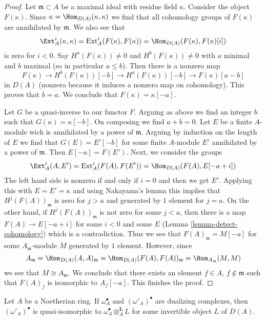 \begin{proof}
Let $\mathfrak m \subset A$ be a maximal ideal with residue field $\kappa$.
Consider the object $F(\kappa)$. Since
$\kappa = \Hom_{D(A)}(\kappa, \kappa)$ we find that all
cohomology groups of $F(\kappa)$ are annihilated by $\mathfrak m$.
We also see that
$$
\Ext^i_A(\kappa, \kappa) = \text{Ext}^i_A(F(\kappa), F(\kappa))
= \Hom_{D(A)}(F(\kappa), F(\kappa)[i])
$$
is zero for $i < 0$. Say $H^a(F(\kappa)) \not = 0$ and
$H^b(F(\kappa)) \not = 0$ with $a$ minimal and $b$ maximal
(so in particular $a \leq b$). Then there is a nonzero map
$$
F(\kappa) \to H^b(F(\kappa))[-b] \to H^a(F(\kappa))[-b]
\to F(\kappa)[a - b]
$$
in $D(A)$ (nonzero because it induces a nonzero map on cohomology).
This proves that $b = a$. We conclude that $F(\kappa) = \kappa[-a]$.

\medskip\noindent
Let $G$ be a quasi-inverse to our functor $F$. Arguing as above
we find an integer $b$ such that $G(\kappa) = \kappa[-b]$.
On composing we find $a + b = 0$. Let $E$ be a finite $A$-module
wich is annihilated by a power of $\mathfrak m$. Arguing by
induction on the length of $E$ we find that $G(E) = E'[-b]$
for some finite $A$-module $E'$ annihilated by a power of
$\mathfrak m$. Then $E[-a] = F(E')$.
Next, we consider the groups
$$
\Ext^i_A(A, E') = \text{Ext}^i_A(F(A), F(E')) =
\Hom_{D(A)}(F(A), E[-a + i])
$$
The left hand side is nonzero if and only if $i = 0$ and then
we get $E'$. Applying this with $E = E' = \kappa$ and using Nakayama's
lemma this implies that $H^j(F(A))_\mathfrak m$ is zero for $j > a$ and
generated by $1$ element for $j = a$. On the other hand, if
$H^j(F(A))_\mathfrak m$ is not zero for some $j < a$, then
there is a map $F(A) \to E[-a + i]$ for some $i < 0$ and some
$E$ (Lemma \ref{lemma-detect-cohomology}) which is a contradiction.
Thus we see that $F(A)_\mathfrak m = M[-a]$
for some $A_\mathfrak m$-module $M$ generated by $1$ element.
However, since
$$
A_\mathfrak m = \Hom_{D(A)}(A, A)_\mathfrak m =
\Hom_{D(A)}(F(A), F(A))_\mathfrak m = \Hom_{A_\mathfrak m}(M, M)
$$
we see that $M \cong A_\mathfrak m$. We conclude that there exists
an element $f \in A$, $f \not \in \mathfrak m$ such that
$F(A)_f$ is isomorphic to $A_f[-a]$. This finishes the proof.
\end{proof}

\begin{lemma}
\label{lemma-dualizing-unique}
Let $A$ be a Noetherian ring. If $\omega_A^\bullet$ and
$(\omega'_A)^\bullet$ are dualizing complexes, then
$(\omega'_A)^\bullet$ is quasi-isomorphic to
$\omega_A^\bullet \otimes_A^\mathbf{L} L$
for some invertible object $L$ of $D(A)$.
\end{lemma}

